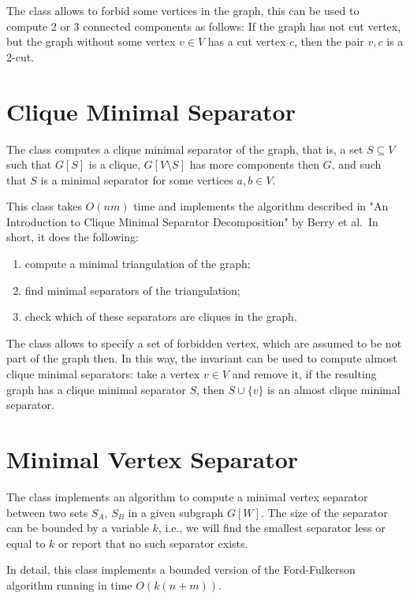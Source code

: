 \documentclass[a4paper, ukenglish, twoside, openright]{jdrasilmanual}
\begin{document}
The class allows to forbid some vertices in the graph, this can be used
to compute 2 or 3 connected components as follows: If the graph has not
cut vertex, but the graph without some vertex \(v\in V\) has a cut
vertex \(c\), then the pair \(v,c\) is a 2-cut.

\section{Clique Minimal Separator}
The class  computes a clique minimal separator of the graph, that is, a set
\(S\subseteq V\) such that \(G[S]\) is a clique, \(G[V\setminus S]\)
has more components then $G$, and such that \(S\) is a minimal separator
for some vertices \(a,b\in V\).
 
This class takes \(O(nm)\) time and implements the algorithm described
in "An Introduction to Clique Minimal Separator Decomposition" by
Berry et al.\, In short, it does the following:
\begin{enumerate}
  \item compute a minimal triangulation of the graph;
  \item find minimal separators of the triangulation;
  \item check which of these separators are cliques in the graph.
 \end{enumerate}
 The class allows to specify a set of forbidden vertex, which are
 assumed to be not part of the graph then. In this way, the invariant
 can be used to compute almost clique minimal separators: take a
 vertex \(v\in V\) and remove it, if the resulting graph has a clique
 minimal separator \(S\), then \(S\cup\{v\}\) is an almost clique
 minimal separator.

\section{Minimal Vertex Separator}
The class  implements an algorithm to compute a minimal vertex
separator between two sets \(S_A\), \(S_B\) in a given subgraph
\(G[W]\). The size of the separator can be bounded by a variable
\(k\), i.e., we will find the smallest separator less or equal to
\(k\) or report that no such separator exists.
 
In detail, this class implements a bounded version of the
Ford-Fulkerson algorithm running in time \(O(k(n+m))\).
\end{document}
